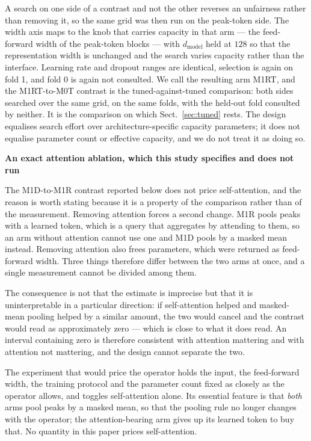 \documentclass[11pt]{article}
\newcommand{\hd}[1]{\medskip\par\noindent\textbf{#1}\par\nobreak\vspace{2pt}\noindent\ignorespaces}
\begin{document}
A search on one side of a contrast and not the other reverses an unfairness
rather than removing it, so the same grid was then run on the peak-token side. The
width axis maps to the knob that carries capacity in that arm --- the feed-forward
width of the peak-token blocks --- with $d_{\mathrm{model}}$ held at $128$ so that
the representation width is unchanged and the search varies capacity rather than
the interface. Learning rate and dropout ranges are identical, selection is again
on fold 1, and fold 0 is again not consulted. We call the resulting arm M1RT, and
the M1RT-to-M0T contrast is the tuned-against-tuned comparison: both sides searched
over the same grid, on the same folds, with the held-out fold consulted by neither.
It is the comparison on which Sect.~\ref{sec:tuned} rests. The design equalises
search effort over architecture-specific capacity parameters; it does not equalise
parameter count or effective capacity, and we do not treat it as doing so.

\hd{An exact attention ablation, which this study specifies and does not run}
The M1D-to-M1R contrast reported below does not price self-attention, and the reason is worth stating because it is a property of the comparison rather than of the measurement. Removing attention forces a second change. M1R pools peaks with a learned token, which is a query that aggregates by attending to them, so an arm without attention cannot use one and M1D pools by a masked mean instead. Removing attention also frees parameters, which were returned as feed-forward width. Three things therefore differ between the two arms at once, and a single measurement cannot be divided among them.

The consequence is not that the estimate is imprecise but that it is uninterpretable in a particular direction: if self-attention helped and masked-mean pooling helped by a similar amount, the two would cancel and the contrast would read as approximately zero --- which is close to what it does read. An interval containing zero is therefore consistent with attention mattering and with attention not mattering, and the design cannot separate the two.

The experiment that would price the operator holds the input, the feed-forward width, the training protocol and the parameter count fixed as closely as the operator allows, and toggles self-attention alone. Its essential feature is that \emph{both} arms pool peaks by a masked mean, so that the pooling rule no longer changes with the operator; the attention-bearing arm gives up its learned token to buy that. No quantity in this paper prices self-attention.
\end{document}
